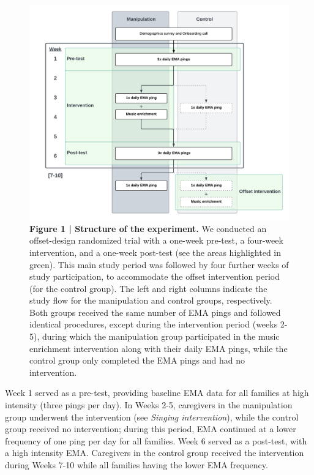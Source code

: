 \documentclass[
]{article}
\begin{document}
\begin{figure}[H]

{\centering \includegraphics[width=0.9\linewidth,]{../viz/figure1} 

}

\caption{\textbf{Figure 1 | Structure of the experiment.} We conducted an offset-design randomized trial with a one-week pre-test, a four-week intervention, and a one-week post-test (see the areas highlighted in green). This main study period was followed by four further weeks of study participation, to accommodate the offset intervention period (for the control group). The left and right columns indicate the study flow for the manipulation and control groups, respectively. Both groups received the same number of EMA pings and followed identical procedures, except during the intervention period (weeks 2-5), during which the manipulation group participated in the music enrichment intervention along with their daily EMA pings, while the control group only completed the EMA pings and had no intervention.}\label{fig:figure 1}
\end{figure}

Week 1 served as a pre-test, providing baseline EMA data for all
families at high intensity (three pings per day). In Weeks 2-5,
caregivers in the manipulation group underwent the intervention (see
\emph{Singing intervention}), while the control group received no
intervention; during this period, EMA continued at a lower frequency of
one ping per day for all families. Week 6 served as a post-test, with a
high intensity EMA. Caregivers in the control group received the
intervention during Weeks 7-10 while all families having the lower EMA
frequency.
\end{document}
